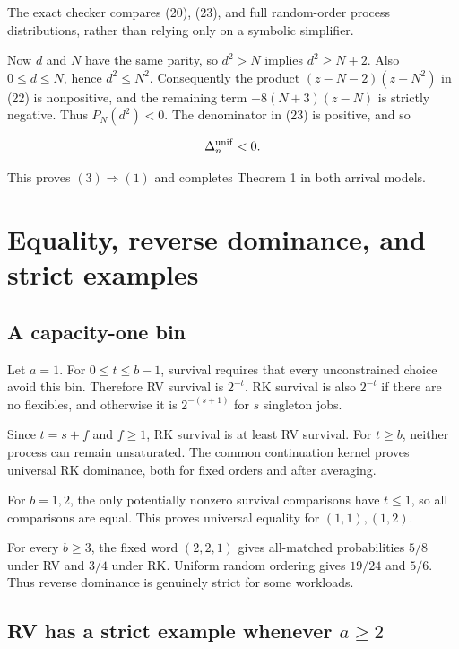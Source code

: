 The exact checker compares (20), (23), and full random-order process distributions, rather than relying only on a symbolic simplifier.

Now \(d\) and \(N\) have the same parity, so \(d^2>N\) implies \(d^2\ge N+2\). Also \(0\le d\le N\), hence \(d^2\le N^2\). Consequently the product \((z-N-2)(z-N^2)\) in (22) is nonpositive, and the remaining term \(-8(N+3)(z-N)\) is strictly negative. Thus \(P_N(d^2)<0\). The denominator in (23) is positive, and so

\[
\Delta^{\rm unif}_{n}<0.
\]

This proves \((3) \Rightarrow  (1)\) and completes Theorem 1 in both arrival models.

\section{Equality, reverse dominance, and strict examples}\label{equality-reverse-dominance-and-strict-examples}

\subsection{A capacity-one bin}\label{a-capacity-one-bin}

Let \(a=1\). For \(0\le t\le b-1\), survival requires that every unconstrained choice avoid this bin. Therefore RV survival is \(2^{-t}\). RK survival is also \(2^{-t}\) if there are no flexibles, and otherwise it is \(2^{-(s+1)}\) for \(s\) singleton jobs.

Since \(t=s+f\) and \(f\ge 1\), RK survival is at least RV survival. For \(t\ge b\), neither process can remain unsaturated. The common continuation kernel proves universal RK dominance, both for fixed orders and after averaging.

For \(b=1,2\), the only potentially nonzero survival comparisons have \(t\le 1\), so all comparisons are equal. This proves universal equality for \((1,1),(1,2)\).

For every \(b\ge 3\), the fixed word \((2,2,1)\) gives all-matched probabilities \(5/8\) under RV and \(3/4\) under RK. Uniform random ordering gives \(19/24\) and \(5/6\). Thus reverse dominance is genuinely strict for some workloads.

\subsection{\texorpdfstring{RV has a strict example whenever \(a\ge 2\)}{RV has a strict example whenever a\textbackslash ge 2}}\label{rv-has-a-strict-example-whenever-age-2}

